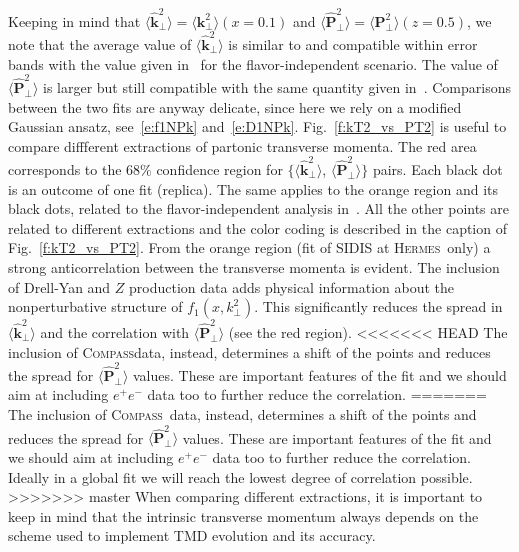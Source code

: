 \documentclass[aps,preprintnumbers,showpacs,nofootinbib,superscriptaddress,floatfix]{revtex4}
\newcommand{\hermes}{\textsc{Hermes}}
\newcommand{\compass}{\textsc{Compass}}
\newcommand{\T}{\perp}
\begin{document}
Keeping in mind that $\big \langle \hat{\bm{k}}_{\T}^2 \big \rangle = \big \langle \bm{k}_{\T}^2 \big \rangle (x=0.1)$ and  $\big \langle \hat{\bm{P}}_{\perp}^2 \big \rangle = \big \langle \bm{P}_{\perp}^2 \big \rangle (z=0.5)$, we note that the average value of $\big \langle \hat{\bm{k}}_{\T}^2 \big \rangle$ is similar to and compatible within error bands with the value given in~\cite{Signori:2013mda} for the flavor-independent scenario. The value of $\big \langle \hat{\bm{P}}_{\perp}^2 \big \rangle$ is larger but still compatible with the same quantity given in~\cite{Signori:2013mda}. Comparisons between the two fits are anyway delicate, since here we rely on a modified Gaussian ansatz, see~\eqref{e:f1NPk} and~\eqref{e:D1NPk}.
Fig.~\ref{f:kT2_vs_PT2} is useful to compare diffferent extractions of partonic transverse momenta. The red area corresponds to the $68\%$ confidence region for $\{ \big \langle \hat{\bm{k}}_{\T}^2 \big \rangle$, $\big \langle \hat{\bm{P}}_{\perp}^2 \big \rangle \}$ pairs. Each black dot is an outcome of one fit (replica). The same applies to the orange region and its black dots, related to the flavor-independent analysis in~\cite{Signori:2013mda}. All the other points are related to different extractions and the color coding is described in the caption of Fig.~\ref{f:kT2_vs_PT2}. 
From the orange region (fit of SIDIS at \hermes\ only) a strong anticorrelation between the transverse momenta is evident. 
The inclusion of Drell-Yan and $Z$ production data adds physical information about the nonperturbative structure of  $f_1(x,k_\perp^2)$. This significantly reduces the spread in $\big \langle \hat{\bm{k}}_{\T}^2 \big \rangle$ and the correlation with $\big \langle \hat{\bm{P}}_{\perp}^2 \big \rangle$ (see the red region). 
<<<<<<< HEAD
The inclusion of \compass data, instead, determines a shift of the points and reduces the spread for $\big \langle \hat{\bm{P}}_{\perp}^2 \big \rangle$ values. 
These are important features of the fit and we should aim at including
$e^+e^-$ data too to further reduce the correlation. 
=======
The inclusion of \compass\ data, instead, determines a shift of the points and reduces the spread for $\big \langle \hat{\bm{P}}_{\perp}^2 \big \rangle$ values. 
These are important features of the fit and we should aim at including $e^+e^-$ data too to further reduce the correlation. Ideally in a global fit we will reach the lowest degree of correlation possible.  
>>>>>>> master
When comparing different extractions, it is important to keep in mind that the intrinsic transverse momentum always depends on the scheme used to implement TMD evolution and its accuracy. 
\end{document}
